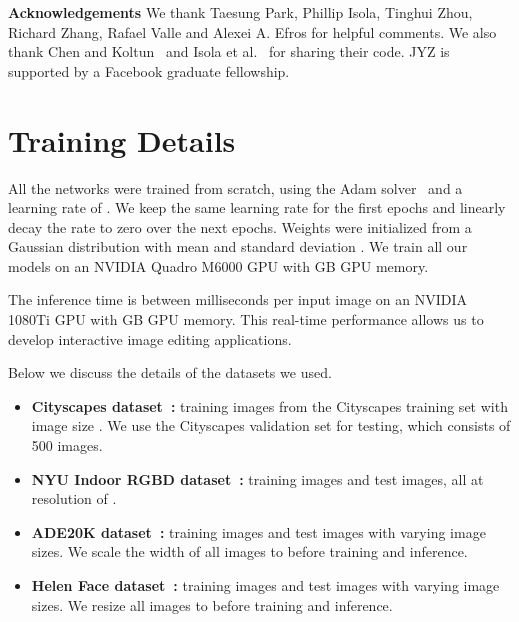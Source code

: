 \documentclass[10pt,twocolumn,letterpaper]{article}
\newcommand{\ck}{Chen and Koltun~\cite{chen2017photographic}\xspace}
\begin{document}
\vspace{.15in}
{\noindent \bf Acknowledgements} We thank Taesung Park, Phillip Isola, Tinghui Zhou, Richard Zhang, Rafael Valle and Alexei A. Efros for helpful comments. We also thank \ck and Isola et al.~\cite{isola2016image} for sharing their code. JYZ is supported by a Facebook graduate fellowship. 
\clearpage{\thispagestyle{empty}\cleardoublepage}


\clearpage 

\appendix
\section{Training Details}
All the networks were trained from scratch, using the Adam solver~\cite{kingma2014adam} and a learning rate of . We keep the same learning rate for the first  epochs and linearly decay the rate to zero over the next  epochs. Weights were initialized from a Gaussian distribution with mean  and standard deviation . We train all our models on an NVIDIA Quadro M6000 GPU with GB GPU memory.

The inference time is between  milliseconds per  input image on an NVIDIA 1080Ti GPU with GB GPU memory. This real-time performance allows us to develop interactive image editing applications. 

Below we discuss the details of the datasets we used. 

\begin{itemize}
    \item {\bf Cityscapes dataset~\cite{Cordts2016cityscapes}: }  training images from the Cityscapes training set with image size . We use the Cityscapes validation set for testing, which consists of 500 images.
    
    \item {\bf NYU Indoor RGBD dataset~\cite{Silberman2012indoor}: }
 training images and  test images, all at resolution of .

    \item {\bf ADE20K dataset~\cite{zhou2017scene}: }
 training images and  test images with varying image sizes. We scale the width of all images to  before training and inference.

    \item {\bf Helen Face dataset~\cite{le2012interactive,smith2013exemplar}: }
 training images and  test images with varying image sizes. We resize all images to  before training and inference.
\end{itemize}
\end{document}
